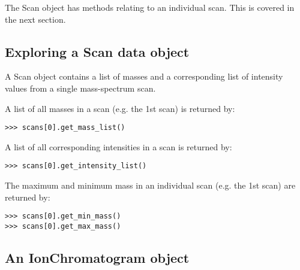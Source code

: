 \noindent
The Scan object has methods relating to an individual scan. This is covered in
the next section.

\subsection{Exploring a Scan data object}


A Scan object contains a list of masses and a corresponding list of intensity
values from a single mass-spectrum scan.

A list of all masses in a scan (e.g. the 1st scan) is returned by:

\begin{verbatim}
>>> scans[0].get_mass_list()
\end{verbatim}

A list of all corresponding intensities in a scan is returned by:

\begin{verbatim}
>>> scans[0].get_intensity_list()
\end{verbatim}

The maximum and minimum mass in an individual scan (e.g. the 1st scan) are
returned by:

\begin{verbatim}
>>> scans[0].get_min_mass()
>>> scans[0].get_max_mass()
\end{verbatim}

\subsection{An IonChromatogram object}



